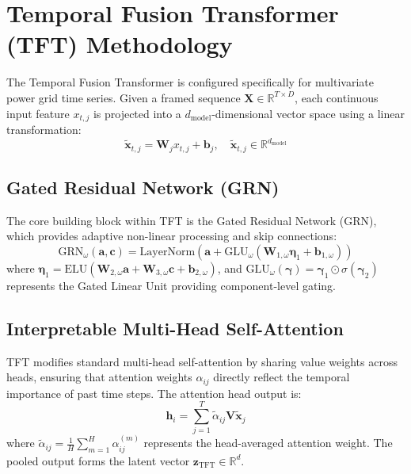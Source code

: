 \documentclass[12pt,a4paper]{report}
\begin{document}
\section{Temporal Fusion Transformer (TFT) Methodology}
The Temporal Fusion Transformer is configured specifically for multivariate power grid time series. Given a framed sequence $\mathbf{X} \in \mathbb{R}^{T \times D}$, each continuous input feature $x_{t, j}$ is projected into a $d_{\text{model}}$-dimensional vector space using a linear transformation:
\begin{equation}
    \tilde{\mathbf{x}}_{t, j} = \mathbf{W}_j x_{t, j} + \mathbf{b}_j, \quad \tilde{\mathbf{x}}_{t, j} \in \mathbb{R}^{d_{\text{model}}}
\end{equation}

\subsection{Gated Residual Network (GRN)}
The core building block within TFT is the Gated Residual Network (GRN), which provides adaptive non-linear processing and skip connections:
\begin{equation}
    \text{GRN}_\omega(\mathbf{a}, \mathbf{c}) = \text{LayerNorm}\left( \mathbf{a} + \text{GLU}_\omega\left( \mathbf{W}_{1, \omega} \mathbf{\eta}_1 + \mathbf{b}_{1, \omega} \right) \right)
\end{equation}
where $\mathbf{\eta}_1 = \text{ELU}(\mathbf{W}_{2, \omega} \mathbf{a} + \mathbf{W}_{3, \omega} \mathbf{c} + \mathbf{b}_{2, \omega})$, and $\text{GLU}_\omega(\boldsymbol{\gamma}) = \boldsymbol{\gamma}_1 \odot \sigma(\boldsymbol{\gamma}_2)$ represents the Gated Linear Unit providing component-level gating.

\subsection{Interpretable Multi-Head Self-Attention}
TFT modifies standard multi-head self-attention by sharing value weights across heads, ensuring that attention weights $\alpha_{ij}$ directly reflect the temporal importance of past time steps. The attention head output is:
\begin{equation}
    \mathbf{h}_i = \sum_{j=1}^T \tilde{\alpha}_{ij} \mathbf{V} \tilde{\mathbf{x}}_j
\end{equation}
where $\tilde{\alpha}_{ij} = \frac{1}{H} \sum_{m=1}^H \alpha_{ij}^{(m)}$ represents the head-averaged attention weight. The pooled output forms the latent vector $\mathbf{z}_{\text{TFT}} \in \mathbb{R}^d$.
\end{document}
